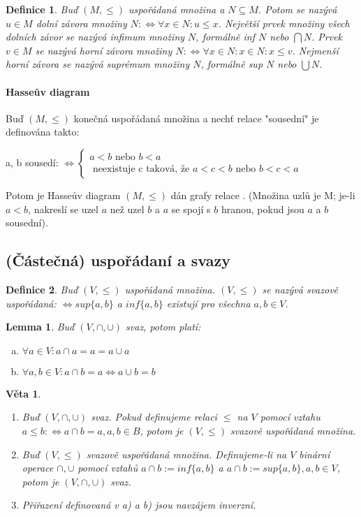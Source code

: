 \documentclass[a4paper, 11pt]{report}
\newtheorem{mydef}{Definice}[chapter]
\newtheorem{veta}{Věta}[chapter]
\newtheorem{lemma}{Lemma}[chapter]
\begin{document}
\begin{mydef}
Buď $(M, \leq)$ uspořádaná množina a $N \subseteq M$. Potom se nazývá $u \in M$ dolní závora množiny $N : \Leftrightarrow \forall x \in N: u \leq x$. Největší prvek množiny všech dolních závor se nazývá \emph{infimum} množiny $N$, formálně inf $N$ nebo $\bigcap N$. Prvek $v \in M$ se nazývá horní závora množiny $N: \Leftrightarrow \forall x \in N: x \in N: x \leq v$. Nejmenší horní závora se nazývá suprémum množiny $N$, formálně sup $N$ nebo $\bigcup N$.
\end{mydef}

\paragraph{Hasseův diagram} Buď $(M, \leq)$ konečná uspořádaná množina a nechť relace "sousední" je definována takto:

a, b sousedí: $\Leftrightarrow \begin{cases}
a < b \text{ nebo } b < a \\
\text{ neexistuje c taková, že } a < c < b \text{ nebo } b < c < a
\end{cases}$

Potom je Hasseův diagram $(M, \leq)$ dán grafy relace . (Množina uzlů je M; je-li $a < b$, nakreslí se uzel $a$  než uzel $b$ a $a$ se spojí s $b$ hranou, pokud jsou $a$ a $b$ sousední).

\subsection{(Částečná) uspořádaní a svazy}
\begin{mydef}
Buď $(V, \leq)$ uspořádaná množina. $(V, \leq)$ se nazývá svazově uspořádaná: $\Leftrightarrow sup\{a, b\}$ a $inf\{a, b\}$ existují pro všechna $a, b \in V$.
\end{mydef}

\begin{lemma}
Buď $(V, \cap, \cup)$ svaz, potom platí:
\begin{enumerate}[a)]
	\item $\forall a \in V: a \cap a = a = a \cup a$
	\item $\forall a, b \in V: a \cap b = a \Leftrightarrow a \cup b = b$
\end{enumerate}
\end{lemma}

\begin{veta}
\begin{enumerate}
	\item Buď $(V, \cap, \cup)$ svaz. Pokud definujeme relaci $\leq$ na $V$ pomocí vztahu $a \leq b: \Leftrightarrow a \cap b = a, a,b \in B$, potom je $(V, \leq)$ svazově uspořádaná množina.
	\item Buď $(V, \leq)$ svazově uspořádaná množina. Definujeme-li na $V$ binární operace $\cap, \cup$ pomocí vztahů $a \cap b := inf\{a, b\}$ a $a \cap b := sup\{a, b\}, a, b \in V$, potom je $(V, \cap, \cup)$ svaz.
	\item Přiřazení definovaná v a) a b) jsou navzájem inverzní.
\end{enumerate}
\end{veta}
\end{document}
